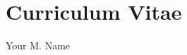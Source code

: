 \documentclass[12pt,letterpaper]{report}
\begin{document}








\newpage
\singlespace

\newpage  
\chapter*{Curriculum Vitae} %
{\noindent}{\Large Your M. Name} \\ %
\newline

\end{document}
